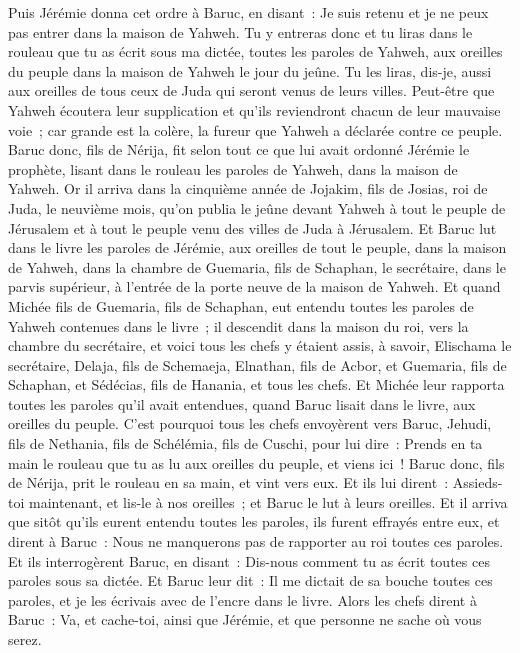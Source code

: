 \begin{multicols}{2}
Puis Jérémie donna cet ordre à Baruc, en disant~: Je suis retenu et je ne peux pas entrer dans la maison de Yahweh.
Tu y entreras donc et tu liras dans le rouleau que tu as écrit sous ma dictée, toutes les paroles de Yahweh, aux oreilles du peuple dans la maison de Yahweh le jour du jeûne. Tu les liras, dis-je, aussi aux oreilles de tous ceux de Juda qui seront venus de leurs villes.
Peut-être que Yahweh écoutera leur supplication et qu'ils reviendront chacun de leur mauvaise voie~; car grande est la colère, la fureur que Yahweh a déclarée contre ce peuple.
Baruc donc, fils de Nérija, fit selon tout ce que lui avait ordonné Jérémie le prophète, lisant dans le rouleau les paroles de Yahweh, dans la maison de Yahweh.
Or il arriva dans la cinquième année de Jojakim, fils de Josias, roi de Juda, le neuvième mois, qu'on publia le jeûne devant Yahweh à tout le peuple de Jérusalem et à tout le peuple venu des villes de Juda à Jérusalem.
Et Baruc lut dans le livre les paroles de Jérémie, aux oreilles de tout le peuple, dans la maison de Yahweh, dans la chambre de Guemaria, fils de Schaphan, le secrétaire, dans le parvis supérieur, à l'entrée de la porte neuve de la maison de Yahweh.
Et quand Michée fils de Guemaria, fils de Schaphan, eut entendu toutes les paroles de Yahweh contenues dans le livre~;
il descendit dans la maison du roi, vers la chambre du secrétaire, et voici tous les chefs y étaient assis, à savoir, Elischama le secrétaire, Delaja, fils de Schemaeja, Elnathan, fils de Acbor, et Guemaria, fils de Schaphan, et Sédécias, fils de Hanania, et tous les chefs.
Et Michée leur rapporta toutes les paroles qu'il avait entendues, quand Baruc lisait dans le livre, aux oreilles du peuple.
C'est pourquoi tous les chefs envoyèrent vers Baruc, Jehudi, fils de Nethania, fils de Schélémia, fils de Cuschi, pour lui dire~: Prends en ta main le rouleau que tu as lu aux oreilles du peuple, et viens ici~! Baruc donc, fils de Nérija, prit le rouleau en sa main, et vint vers eux.
Et ils lui dirent~: Assieds-toi maintenant, et lis-le à nos oreilles~; et Baruc le lut à leurs oreilles.
Et il arriva que sitôt qu'ils eurent entendu toutes les paroles, ils furent effrayés entre eux, et dirent à Baruc~: Nous ne manquerons pas de rapporter au roi toutes ces paroles.
Et ils interrogèrent Baruc, en disant~: Dis-nous comment tu as écrit toutes ces paroles sous sa dictée.
Et Baruc leur dit~: Il me dictait de sa bouche toutes ces paroles, et je les écrivais avec de l'encre dans le livre.
Alors les chefs dirent à Baruc~: Va, et cache-toi, ainsi que Jérémie, et que personne ne sache où vous serez.

\end{multicols}
